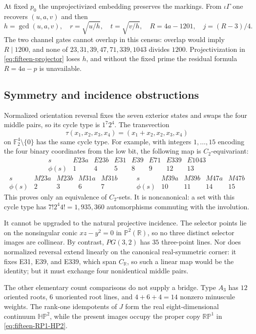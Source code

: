 At fixed $p_0$ the unprojectivized embedding preserves the markings.  From
$\iota\Gamma$ one recovers $(u,a,v)$ and then
\[
 h=\gcd(u,a,v),\quad r=\sqrt{u/h},\quad t=\sqrt{v/h},\quad
 R=4a-1201,\quad j=(R-3)/4.
\]
The two channel gates cannot overlap in this census: overlap would imply
$R\mid1200$, and none of $23,31,39,47,71,339,1043$ divides $1200$.
Projectivization in \eqref{eq:fifteen-projector} loses $h$, and without the
fixed prime the residual formula $R=4a-p$ is unavailable.

\subsection{Symmetry and incidence obstructions}

Normalized orientation reversal fixes the seven exterior states and swaps
the four middle pairs, so its cycle type is $1^7 2^4$.  The transvection
\[
 \tau(x_1,x_2,x_3,x_4)=(x_1+x_2,x_2,x_3,x_4)
\]
on $\mathbb F_2^4\setminus\{0\}$ has the same cycle type.  For example, with
integers $1,\ldots,15$ encoding the four binary coordinates from the low bit,
the following map is $C_2$-equivariant:
\[
\begin{array}{c|rrrrrrr}
s&E23a&E23b&E31&E39&E71&E339&E1043\\\hline
\phi(s)&1&4&5&8&9&12&13
\end{array}
\]
\[
\begin{array}{c|rrrr}
s&M23a&M23b&M31a&M31b\\\hline
\phi(s)&2&3&6&7
\end{array}
\qquad
\begin{array}{c|rrrr}
s&M39a&M39b&M47a&M47b\\\hline
\phi(s)&10&11&14&15
\end{array}
\]
This proves only an equivalence of $C_2$-sets.  It is noncanonical: a set
with this cycle type has $7!2^4 4!=1{,}935{,}360$ automorphisms commuting
with the involution.

It cannot be upgraded to the natural projective incidence.  The selector
points lie on the nonsingular conic $xz-y^2=0$ in
$\mathbb P^2(\mathbb R)$, so no three distinct selector images are collinear.
By contrast, $PG(3,2)$ has $35$ three-point lines.  Nor does normalized
reversal extend linearly on the canonical real-symmetric corner: it fixes
E31, E39, and E339, which span $C_{\mathbb R}$, so such a linear map would be
the identity; but it must exchange four nonidentical middle pairs.

The other elementary count comparisons do not supply a bridge.  Type $A_3$
has $12$ oriented roots, $6$ unoriented root lines, and $4+6+4=14$ nonzero
minuscule weights.  The rank-one idempotents of $J$ form the real
eight-dimensional continuum $\mathbb{HP}^2$, while the present images occupy
the proper copy $\mathbb{RP}^1$ in \eqref{eq:fifteen-RP1-HP2}.

